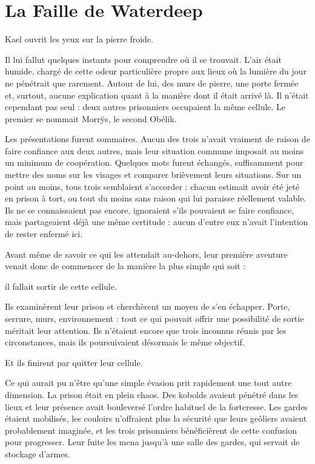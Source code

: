 \chapter{La Faille de Waterdeep}

Kael ouvrit les yeux sur la pierre froide.

Il lui fallut quelques instants pour comprendre où il se trouvait. L'air était humide, chargé de cette odeur particulière propre aux lieux où la lumière du jour ne pénétrait que rarement. Autour de lui, des murs de pierre, une porte fermée et, surtout, aucune explication quant à la manière dont il était arrivé là. Il n'était cependant pas seul : deux autres prisonniers occupaient la même cellule. Le premier se nommait Morrÿs, le second Obélik.

Les présentations furent sommaires. Aucun des trois n'avait vraiment de raison de faire confiance aux deux autres, mais leur situation commune imposait au moins un minimum de coopération. Quelques mots furent échangés, suffisamment pour mettre des noms sur les visages et comparer brièvement leurs situations. Sur un point au moins, tous trois semblaient s'accorder : chacun estimait avoir été jeté en prison à tort, ou tout du moins sans raison qui lui paraisse réellement valable. Ils ne se connaissaient pas encore, ignoraient s'ils pouvaient se faire confiance, mais partageaient déjà une même certitude : aucun d'entre eux n'avait l'intention de rester enfermé ici.

Avant même de savoir ce qui les attendait au-dehors, leur première aventure venait donc de commencer de la manière la plus simple qui soit :

il fallait sortir de cette cellule.

Ils examinèrent leur prison et cherchèrent un moyen de s'en échapper. Porte, serrure, murs, environnement : tout ce qui pouvait offrir une possibilité de sortie méritait leur attention. Ils n'étaient encore que trois inconnus réunis par les circonstances, mais ils poursuivaient désormais le même objectif.

Et ils finirent par quitter leur cellule.

Ce qui aurait pu n'être qu'une simple évasion prit rapidement une tout autre dimension. La prison était en plein chaos. Des kobolds avaient pénétré dans les lieux et leur présence avait bouleversé l'ordre habituel de la forteresse. Les gardes étaient mobilisés, les couloirs n'offraient plus la sécurité que leurs geôliers avaient probablement imaginée, et les trois prisonniers bénéficièrent de cette confusion pour progresser. Leur fuite les mena jusqu'à une salle des gardes, qui servait de stockage d'armes.

